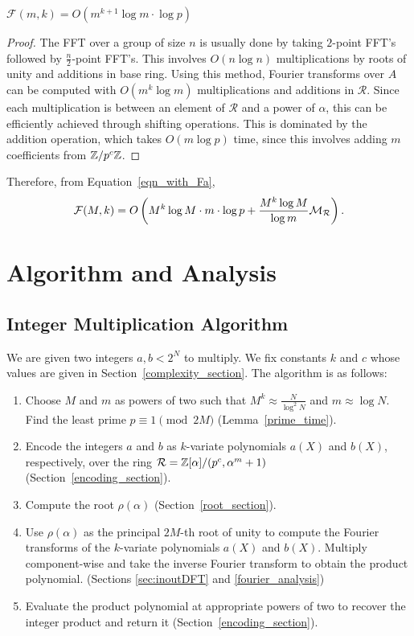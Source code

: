 \documentclass[11pt]{article}
\begin{document}
\begin{lemma}\label{lem-Fmk}
$\mathcal{F}(m,k) = O(m^{k+1}\log m\cdot \log p)$
\end{lemma}
\begin{proof}
The FFT over a group of size $n$ is usually done by taking $2$-point
FFT's followed by $\frac{n}{2}$-point FFT's. This involves $O(n\log
n)$ multiplications by roots of unity and additions in base
ring. Using this method, Fourier transforms over $A$ can be computed
with $O(m^k\log m)$ multiplications and additions in $\mathcal{R}$. Since each
multiplication is between an element of $\mathcal{R}$ and a power of $\alpha$,
this can be efficiently achieved through shifting operations. This is
dominated by the addition operation, which takes $O(m\log p)$ time,
since this involves adding $m$ coefficients from $\mathbb{Z}/p^c\mathbb{Z}$.
\end{proof}

Therefore, from Equation~\ref{eqn_with_Fa},
\begin{equation*}
\mathcal{F}(M,k) = O\left(M^k\log M\cdot m\cdot \log p + \frac{M^k\log
    M}{\log m}\mathcal{M}_{\mathcal{R}}\right).
\end{equation*}

\section{Algorithm and Analysis}
\subsection{Integer Multiplication Algorithm}\label{intmult_section}

We are given two integers $a,b< 2^N$ to multiply. We fix constants $k$
and $c$  whose values are given in
Section~\ref{complexity_section}. The algorithm is as follows:
\begin{enumerate}
\item Choose $M$ and $m$ as powers of two such that $M^k \approx
  \frac{N}{\log^2N}$ and $m \approx \log N$. Find the least prime
  $p\equiv 1\pmod{2M}$ (Lemma~\ref{prime_time}).
\item Encode the integers $a$ and $b$ as $k$-variate polynomials
  $a(X)$ and $b(X)$, respectively, over the ring $\mathcal{R} =
  \mathbb{Z}[\alpha]/(p^c, \alpha^m + 1)$ (Section~\ref{encoding_section}).
\item Compute the root $\rho(\alpha)$ (Section~\ref{root_section}).
\item Use $\rho(\alpha)$ as the principal $2M$-th root of unity to
  compute the Fourier transforms of the $k$-variate polynomials $a(X)$
  and $b(X)$. Multiply component-wise and take the inverse Fourier
  transform to obtain the product polynomial. (Sections
  \ref{sec:inoutDFT} and \ref{fourier_analysis})
\item Evaluate the product polynomial at appropriate powers of two to
  recover the integer product and return it
  (Section~\ref{encoding_section}).
\end{enumerate}
\end{document}
